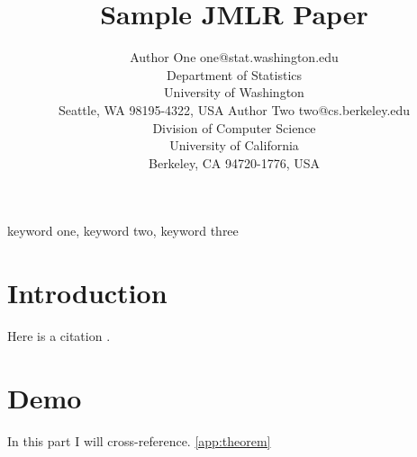 \documentclass[twoside,11pt]{article}
\begin{document}
\title{Sample JMLR Paper}

\author{\name Author One \email one@stat.washington.edu \\
       \addr Department of Statistics\\
       University of Washington\\
       Seattle, WA 98195-4322, USA
       \AND
       \name Author Two \email two@cs.berkeley.edu \\
       \addr Division of Computer Science\\
       University of California\\
       Berkeley, CA 94720-1776, USA}


\maketitle

\begin{abstract}%
\blindtext
\end{abstract}

\begin{keywords}
  keyword one, keyword two, keyword three
\end{keywords}

\section{Introduction}

\blindmathpaper

Here is a citation \cite{chow:68}.

\section{Demo}
In this part I will cross-reference. \ref{app:theorem}



\end{document}
